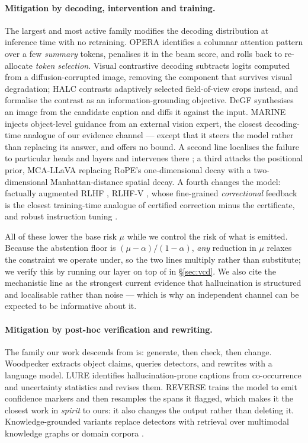 \documentclass{article}
\theoremstyle{plain}
\theoremstyle{definition}
\theoremstyle{remark}
\begin{document}
\paragraph{Mitigation by decoding, intervention and training.}
The largest and most active family modifies the decoding distribution at inference time with
no retraining. OPERA \citep{opera} identifies a columnar attention pattern over a few
\emph{summary} tokens, penalises it in the beam score, and rolls back to re-allocate
\emph{token selection}. Visual contrastive decoding \citep{vcd} subtracts logits computed from
a diffusion-corrupted image, removing the component that survives visual degradation; HALC
\citep{chen2024halc} contrasts adaptively selected field-of-view crops instead, and
\citet{favero2024} formalise the contrast as an information-grounding objective. DeGF
\citep{degf} synthesises an image from the candidate caption and diffs it against the input.
MARINE \citep{marine} injects object-level guidance from an external vision expert, the
closest decoding-time analogue of our evidence channel --- except that it steers the model
rather than replacing its answer, and offers no bound. A second line localises the failure to
particular heads and layers and intervenes there \citep{attnlens,only,maskcd,causalgating};
a third attacks the positional prior, MCA-LLaVA \citep{mcallava} replacing RoPE's
one-dimensional decay with a two-dimensional Manhattan-distance spatial decay. A fourth
changes the model: factually augmented RLHF \citep{sun2024aligning}, RLHF-V
\citep{yu2024rlhfv}, whose fine-grained \emph{correctional} feedback is the closest
training-time analogue of certified correction minus the certificate, and robust instruction
tuning \citep{liu2023lrv}.

All of these lower the base risk $\mu$ while we control the risk of what is emitted. Because
the abstention floor is $(\mu-\alpha)/(1-\alpha)$, \emph{any} reduction in $\mu$ relaxes the
constraint we operate under, so the two lines multiply rather than substitute; we verify this
by running our layer on top of \citet{vcd} in \S\ref{sec:vcd}. We also cite the mechanistic
line as the strongest current evidence that hallucination is structured and localisable
rather than noise --- which is why an independent channel can be expected to be informative
about it.

\paragraph{Mitigation by post-hoc verification and rewriting.}
The family our work descends from is: generate, then check, then change. Woodpecker
\citep{woodpecker} extracts object claims, queries detectors, and rewrites with a language
model. LURE \citep{lure} identifies hallucination-prone captions from co-occurrence and
uncertainty statistics and revises them. REVERSE \citep{reverse} trains the model to emit
confidence markers and then resamples the spans it flagged, which makes it the closest work in
\emph{spirit} to ours: it also changes the output rather than deleting it. Knowledge-grounded
variants replace detectors with retrieval over multimodal knowledge graphs \citep{mkgrag} or
domain corpora \citep{rule}.
\end{document}
